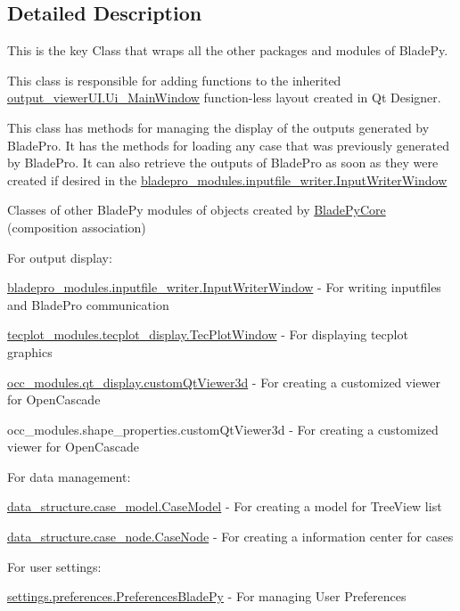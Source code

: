 \subsection{Detailed Description}
This is the key Class that wraps all the other packages and modules of Blade\+Py. 

This class is responsible for adding functions to the inherited \hyperlink{classoutput__viewer_u_i_1_1_ui___main_window}{output\+\_\+viewer\+U\+I.\+Ui\+\_\+\+Main\+Window} function-\/less layout created in Qt Designer.

This class has methods for managing the display of the outputs generated by Blade\+Pro. It has the methods for loading any case that was previously generated by Blade\+Pro. It can also retrieve the outputs of Blade\+Pro as soon as they were created if desired in the \hyperlink{classbladepro__modules_1_1inputfile__writer_1_1_input_writer_window}{bladepro\+\_\+modules.\+inputfile\+\_\+writer.\+Input\+Writer\+Window}

Classes of other Blade\+Py modules of objects created by \hyperlink{class_core_1_1_blade_py_core}{Blade\+Py\+Core} (composition association)

For output display\+: \begin{DoxyItemize}
\item {\ttfamily \hyperlink{classbladepro__modules_1_1inputfile__writer_1_1_input_writer_window}{bladepro\+\_\+modules.\+inputfile\+\_\+writer.\+Input\+Writer\+Window}} -\/ For writing inputfiles and Blade\+Pro communication \item {\ttfamily \hyperlink{classtecplot__modules_1_1tecplot__display_1_1_tec_plot_window}{tecplot\+\_\+modules.\+tecplot\+\_\+display.\+Tec\+Plot\+Window}} -\/ For displaying tecplot graphics \item {\ttfamily \hyperlink{classocc__modules_1_1qt__display_1_1custom_qt_viewer3d}{occ\+\_\+modules.\+qt\+\_\+display.\+custom\+Qt\+Viewer3d}} -\/ For creating a customized viewer for Open\+Cascade \item {\ttfamily occ\+\_\+modules.\+shape\+\_\+properties.\+custom\+Qt\+Viewer3d} -\/ For creating a customized viewer for Open\+Cascade\end{DoxyItemize}
For data management\+: \begin{DoxyItemize}
\item {\ttfamily \hyperlink{classdata__structure_1_1case__model_1_1_case_model}{data\+\_\+structure.\+case\+\_\+model.\+Case\+Model}} -\/ For creating a model for Tree\+View list \item {\ttfamily \hyperlink{classdata__structure_1_1case__node_1_1_case_node}{data\+\_\+structure.\+case\+\_\+node.\+Case\+Node}} -\/ For creating a information center for cases\end{DoxyItemize}
For user settings\+: \begin{DoxyItemize}
\item {\ttfamily \hyperlink{classsettings_1_1preferences_1_1_preferences_blade_py}{settings.\+preferences.\+Preferences\+Blade\+Py}} -\/ For managing User Preferences \end{DoxyItemize}


